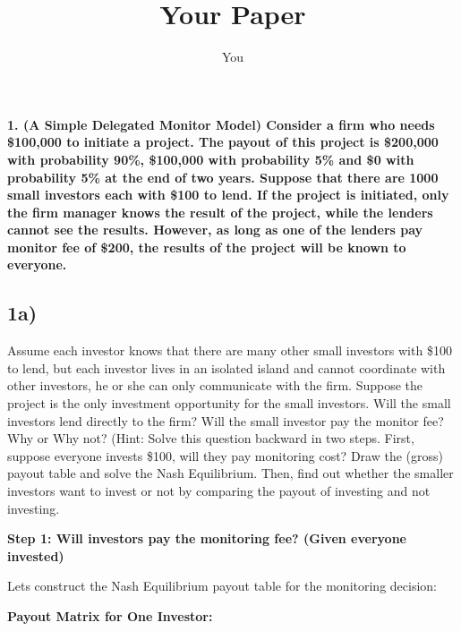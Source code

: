 \documentclass[a4paper]{article}
\title{Your Paper}
\author{You}
\begin{document}
\maketitle

\textbf{1. (A Simple Delegated Monitor Model) Consider a firm who needs
\$100,000 to initiate a project. The payout of this project is \$200,000 with probability 90\%, \$100,000 with probability 5\% and \$0 with probability 5\% at the end of two years. Suppose that there are 1000 small
investors each with \$100 to lend. If the project is
initiated, only the firm manager knows the result of the
project, while the lenders cannot see the results. However, as long as one of the lenders pay monitor fee of \$200, the results of the project will be known to everyone.}

\hypertarget{a}{%
\subsection{1a)}\label{a}}

Assume each investor knows that there are many other small investors
with \$100 to lend, but each investor lives in an isolated island and
cannot coordinate with other investors, he or she can only communicate
with the firm. Suppose the project is the only investment opportunity
for the small investors. Will the small investors lend directly to the
firm? Will the small investor pay the monitor fee? Why or Why not?
(Hint: Solve this question backward in two steps. First, suppose
everyone invests \$100, will they pay monitoring cost? Draw the (gross)
payout table and solve the Nash Equilibrium. Then, find out whether the
smaller investors want to invest or not by comparing the payout of
investing and not investing.

\textbf{Step 1: Will investors pay the monitoring fee? (Given everyone
invested)}

Let\textquotesingle s construct the Nash Equilibrium payout table for
the monitoring decision:

\textbf{Payout Matrix for One Investor:}
\end{document}
